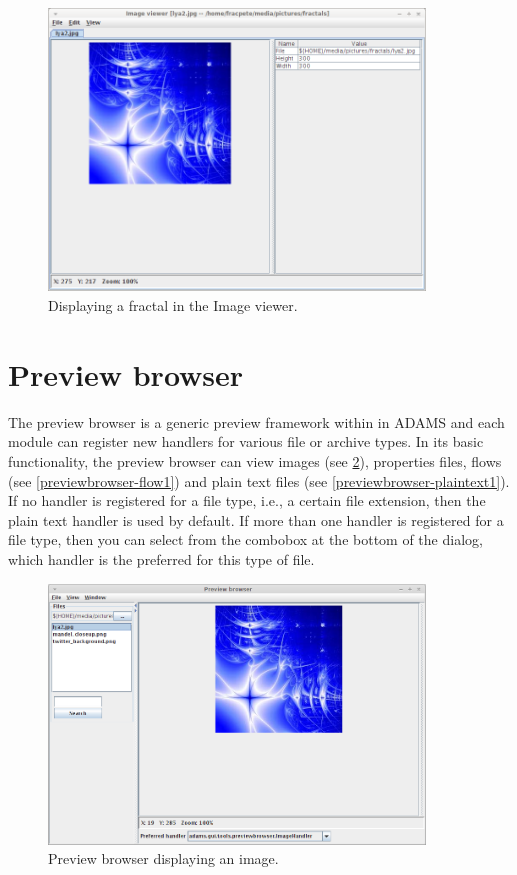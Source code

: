 \begin{figure}[htb]
  \centering
  \includegraphics[width=10.0cm]{images/imageviewer1.png}
  \caption{Displaying a fractal in the Image viewer.}
  \label{imageviewer1}
\end{figure}

\section{Preview browser}
The preview browser is a generic preview framework within in ADAMS and each
module can register new handlers for various file or archive types. In its basic
functionality, the preview browser can view images (see
\ref{previewbrowser-image1}), properties files, flows (see
\ref{previewbrowser-flow1}) and plain text files (see
\ref{previewbrowser-plaintext1}). If no handler is registered for a file type,
i.e., a certain file extension, then the plain text handler is used by default.
If more than one handler is registered for a file type, then you can select
from the combobox at the bottom of the dialog, which handler is the preferred
for this type of file.

\begin{figure}[htb]
  \centering
  \includegraphics[width=10.0cm]{images/previewbrowser-image1.png}
  \caption{Preview browser displaying an image.}
  \label{previewbrowser-image1}
\end{figure}

